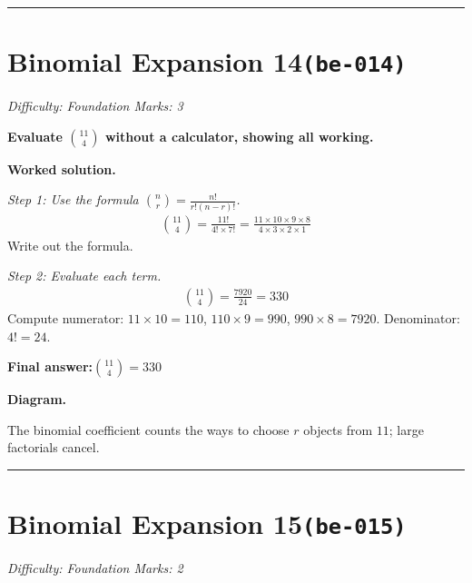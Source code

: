 \documentclass[11pt]{article}
\newcommand{\question}[1]{\par\medskip\noindent\textbf{#1}\par}
\begin{document}
\medskip\hrule

\section*{Binomial Expansion 14\quad\small\texttt{(be-014)}}
\textit{Difficulty: Foundation \quad\textbar\quad Marks: 3}

\question{Evaluate \( \binom{11}{4} \) without a calculator, showing all working.}

\textbf{Worked solution.}

\textit{Step 1: Use the formula \(\binom{n}{r} = \frac{n!}{r!(n-r)!}\).}
\[\begin{gathered}
\binom{11}{4} = \frac{11!}{4! \times 7!} = \frac{11 \times 10 \times 9 \times 8}{4 \times 3 \times 2 \times 1}
\end{gathered}\]
Write out the formula.

\textit{Step 2: Evaluate each term.}
\[\begin{gathered}
\binom{11}{4} = \frac{7920}{24} = 330
\end{gathered}\]
Compute numerator: \(11 \times 10 = 110\), \(110 \times 9 = 990\), \(990 \times 8 = 7920\). Denominator: \(4! = 24\).

\begin{answerbox}
\textbf{Final answer:}\quad \(\displaystyle \binom{11}{4} = 330\)
\end{answerbox}
\textbf{Diagram.}

\begin{center}
\end{center}
\small The binomial coefficient counts the ways to choose $r$ objects from $11$; large factorials cancel.\normalsize

\medskip\hrule

\section*{Binomial Expansion 15\quad\small\texttt{(be-015)}}
\textit{Difficulty: Foundation \quad\textbar\quad Marks: 2}
\end{document}
